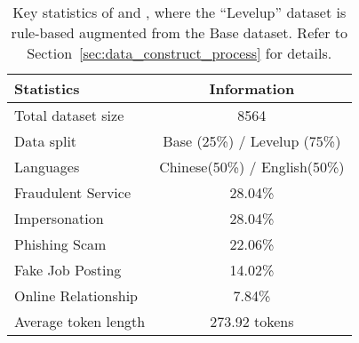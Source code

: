 \begin{table}[t]
\centering
\small
    \begin{tabular}{lc}
        \toprule
        Statistics                     & \multicolumn{1}{c}{Information} \\ \midrule
        Total dataset size & 8564\\
 Data split&Base (25\%) / Levelup (75\%)\\
        Languages& Chinese(50\%) / English(50\%)\\ \midrule
        Fraudulent Service& 28.04\%\\
        Impersonation& 28.04\%\\ 
        Phishing Scam& 22.06\%\\ 
        Fake Job Posting& 14.02\%\\
        Online Relationship& 7.84\%\\ \midrule
        Average token length& 273.92 tokens\\ \bottomrule
    \end{tabular}
    \caption{Key statistics of \ourbasedata  and \ourlevelupdatset, where the ``Levelup'' dataset is rule-based augmented from the Base dataset. Refer to Section~\ref{sec:data_construct_process} for details.}
    \label{tab:dataset_statistics}
    \vspace{-0.5cm}

\end{table}